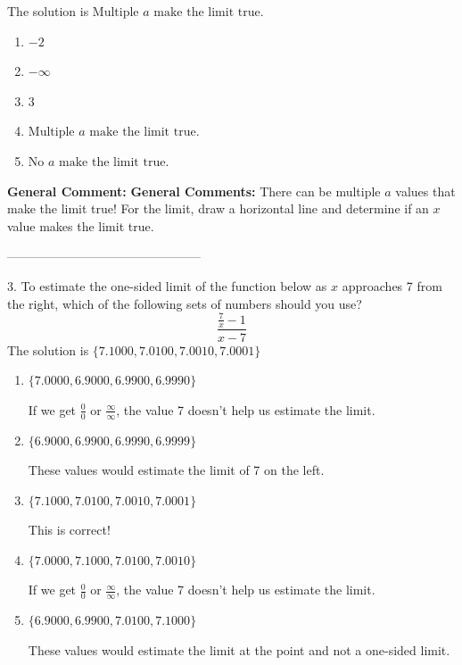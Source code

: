 \documentclass{extbook}[14pt]
\begin{document}
The solution is $ \text{Multiple } a \text{ make the limit true}. $ 

\begin{enumerate}[label=\Alph*.] 
\item $ -2 $ 

  
\item $ -\infty $ 

  
\item $ 3 $ 

  
\item $ \text{Multiple } a \text{ make the limit true}. $ 

  
\item $ \text{No } a \text{ make the limit true}. $ 

  
\end{enumerate} 
 
\textbf{General Comment:} \textbf{General Comments:} There can be multiple $a$ values that make the limit true! For the limit, draw a horizontal line and determine if an $x$ value makes the limit true. 

-----------------------------------------------

3. To estimate the one-sided limit of the function below as $x$ approaches 7 from the right, which of the following sets of numbers should you use?
\[ \frac{\frac{7}{x} - 1}{x - 7} \] 
The solution is $ \{ 7.1000, 7.0100, 7.0010, 7.0001 \} $ 

\begin{enumerate}[label=\Alph*.] 
\item $ \{ 7.0000, 6.9000, 6.9900, 6.9990 \} $ 

 If we get $\frac{0}{0}$ or $\frac{\infty}{\infty}$, the value 7 doesn't help us estimate the limit. 
\item $ \{ 6.9000, 6.9900, 6.9990, 6.9999 \} $ 

 These values would estimate the limit of 7 on the left. 
\item $ \{ 7.1000, 7.0100, 7.0010, 7.0001 \} $ 

 This is correct! 
\item $ \{ 7.0000, 7.1000, 7.0100, 7.0010 \} $ 

 If we get $\frac{0}{0}$ or $\frac{\infty}{\infty}$, the value 7 doesn't help us estimate the limit. 
\item $ \{ 6.9000, 6.9900, 7.0100, 7.1000 \} $ 

 These values would estimate the limit at the point and not a one-sided limit. 
\end{enumerate} 
 
\end{document}
